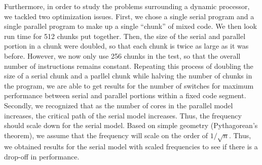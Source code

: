 Furthermore, in order to study the problems surrounding a dynamic processor, we tackled two optimization issues. First, we chose a single serial program and a single parallel program to make up a single ``chunk'' of mixed code. We then look run time for 512 chunks put together. Then, the size of the serial and parallel portion in a chunk were doubled, so that each chunk is twice as large as it was before. However, we now only use 256 chunks in the test, so that the overall number of instructions remains constant. Repeating this process of doubling the size of a serial chunk and a parllel chunk while halving the number of chunks in the program, we are able to get results for the number of switches for maximum performance between serial and parallel portions within a fixed code segment. Secondly, we recognized that as the number of cores in the parallel model increases, the critical path of the serial model increases. Thus, the frequency should scale down for the serial model. Based on simple geometry (Pythagorean's theorem), we assume that the frequency will scale on the order of $1 / \sqrt{n}$. Thus, we obtained results for the serial model with scaled frequencies to see if there is a drop-off in performance.

